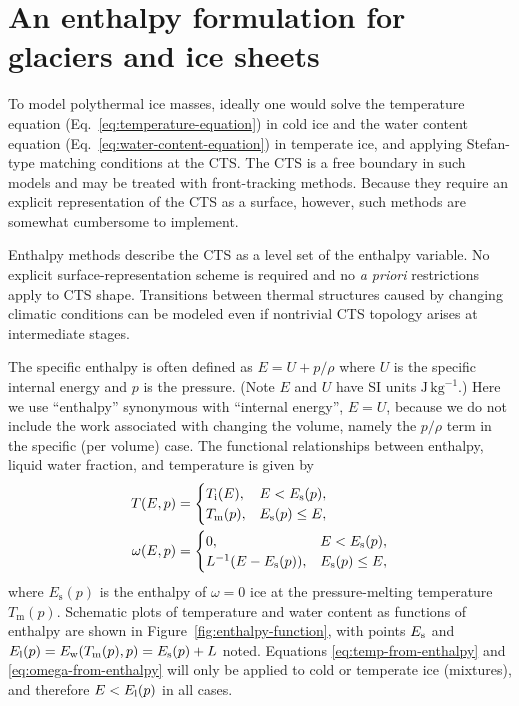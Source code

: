 \documentclass[parskip=half]{scrartcl}
\begin{document}
\section{An enthalpy formulation for glaciers and ice sheets}

To model polythermal ice masses, ideally one would solve the
temperature equation (Eq.~\ref{eq:temperature-equation}) in cold ice
and the water content equation (Eq.~\ref{eq:water-content-equation})
in temperate ice, and applying Stefan-type matching conditions at the
CTS. The CTS is a free boundary in such models and may be treated with
front-tracking methods.  Because they require an explicit
representation of the CTS as a surface, however, such methods are
somewhat cumbersome to implement.

Enthalpy methods describe the CTS as a level set of the enthalpy
variable.  No explicit surface-representation scheme is required and
no \emph{a priori} restrictions apply to CTS shape.  Transitions
between thermal structures caused by changing climatic conditions can
be modeled even if nontrivial CTS topology arises at intermediate
stages.

The specific enthalpy is often defined as $E = U + p/\rho$ where $U$
is the specific internal energy and $p$ is the pressure.  (Note $E$
and $U$ have SI units $\text{J}\,\mathrm{kg}^{-1}$.) Here we use
``enthalpy'' synonymous with ``internal energy'', $E=U$, because we do
not include the work associated with changing the volume, namely the
$p/\rho$ term in the specific (per volume) case. The functional
relationships between enthalpy, liquid water fraction, and temperature
is given by
\begin{align}
\label{eq:temp-from-enthalpy} T(E,p) &= \begin{cases} T_{\text i}(E),
& E < E_{\text s}(p), \\ T_{\text m}(p), & E_{\text s}(p) \le E,
        \end{cases} \\
\label{eq:omega-from-enthalpy} \omega(E,p) &= \begin{cases} 0, & E <
E_{\text s}(p), \\ L^{-1} ( E-E_\mathrm{s}(p) ), & E_{\text s}(p) \le E,
        \end{cases}
\end{align} where $E_{\mathrm{s}}(p)$ is the enthalpy of $\omega=0$ ice
at the pressure-melting temperature $T_{\mathrm{m}}(p)$. Schematic plots
of temperature and water content as functions of enthalpy are shown in
Figure~\ref{fig:enthalpy-function}, with points $E_{\text s}$ and
$E_{\text l}(p) = E_{\text w}(T_{\text m}(p),p) = E_{\text s}(p) + L$
noted.  Equations \eqref{eq:temp-from-enthalpy} and
\eqref{eq:omega-from-enthalpy} will only be applied to cold or
temperate ice (mixtures), and therefore $E<E_{\text l}(p)$ in all
cases.
\end{document}
